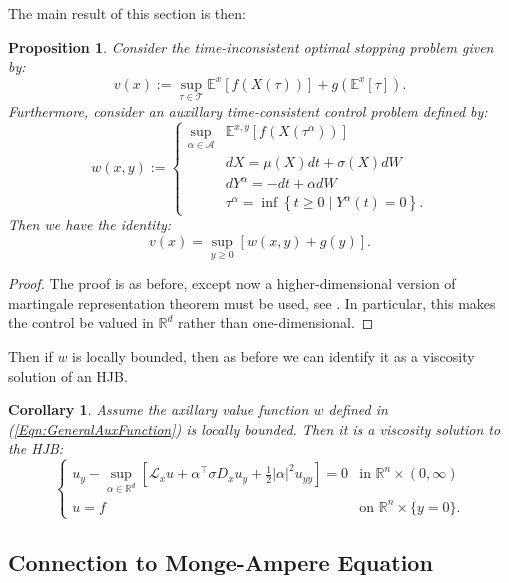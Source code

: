 \documentclass[11pt]{article}
\newtheorem{cor}{Corollary}
\newtheorem{prop}{Proposition}
\begin{document}
The main result of this section is then:
\begin{prop}
Consider the time-inconsistent optimal stopping problem given by:
\begin{equation}
v(x) := \sup\limits_{\tau\in\mathcal{T}}\mathbb{E}^x\left[f(X(\tau))\right]+ g(\mathbb{E}^x\left[\tau\right]).
\end{equation}
Furthermore, consider an auxillary time-consistent control problem defined by:
\begin{equation}\label{Eqn:GeneralAuxFunction}
w(x,y):=\left\{\begin{array}{rl}
\sup\limits_{\alpha\in\mathcal{A}}&\mathbb{E}^{x,y}\left[f(X(\tau^\alpha))\right]\\
& dX = \mu(X)dt + \sigma(X)dW\\
& dY^\alpha = -dt + \alpha dW\\
& \tau^\alpha = \inf\left\{t\geq 0\mid Y^\alpha(t)=0\right\}.
\end{array}\right.
\end{equation}
Then we have the identity:
\begin{equation}
v(x) = \sup\limits_{y\geq 0}\left[w(x,y)+g(y)\right].
\end{equation}
\end{prop}
\begin{proof}The proof is as before, except now a higher-dimensional version of martingale representation theorem must be used, see \cite{Touzi2013}. In particular, this makes the control be valued in $\mathbb{R}^d$ rather than one-dimensional.
\end{proof}

Then if $w$ is locally bounded, then as before we can identify it as a viscosity solution of an HJB.
\begin{cor}
Assume the axillary value function $w$ defined in (\ref{Eqn:GeneralAuxFunction}) is locally bounded. Then it is a viscosity solution to the HJB:
\begin{equation}\label{Eqn:GeneralAuxHJB}
\left\{\begin{array}{rl}
u_y - \sup\limits_{\alpha\in\mathbb{R}^d}\left[\mathcal{L}_x u+\alpha^\top\sigma D_x u_y+\frac{1}{2}|\alpha|^2 u_{yy}\right] = 0 & \text{in }\mathbb{R}^n\times(0,\infty)\\
u = f & \text{on }\mathbb{R}^n\times\{y=0\}.
\end{array}\right.\end{equation}
\end{cor}

\subsection{Connection to Monge-Ampere Equation}
\end{document}
